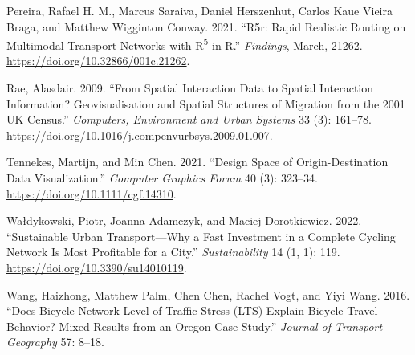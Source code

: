 \documentclass{isprs} %
\newlength{\cslhangindent}
\newlength{\cslentryspacingunit} %
\newenvironment{CSLReferences}[2] %
 {%
  \setlength{\parindent}{0pt}
  \ifodd #1
  \let\oldpar\par
  \def\par{\hangindent=\cslhangindent\oldpar}
  \fi
  \setlength{\parskip}{#2\cslentryspacingunit}
 }%
 {}
\begin{document}
\begin{CSLReferences}{1}{0}
\leavevmode{}%
Pereira, Rafael H. M., Marcus Saraiva, Daniel Herszenhut, Carlos Kaue Vieira Braga, and Matthew Wigginton Conway. 2021. {``R5r: {Rapid Realistic Routing} on {Multimodal Transport Networks} with {R}{\textsuperscript{5}} in {R}.''} \emph{Findings}, March, 21262. \url{https://doi.org/10.32866/001c.21262}.

\leavevmode{}%
Rae, Alasdair. 2009. {``From Spatial Interaction Data to Spatial Interaction Information? {Geovisualisation} and Spatial Structures of Migration from the 2001 {UK} Census.''} \emph{Computers, Environment and Urban Systems} 33 (3): 161--78. \url{https://doi.org/10.1016/j.compenvurbsys.2009.01.007}.

\leavevmode{}%
Tennekes, Martijn, and Min Chen. 2021. {``Design {Space} of {Origin-Destination Data Visualization}.''} \emph{Computer Graphics Forum} 40 (3): 323--34. \url{https://doi.org/10.1111/cgf.14310}.

\leavevmode{}%
Wałdykowski, Piotr, Joanna Adamczyk, and Maciej Dorotkiewicz. 2022. {``Sustainable {Urban Transport}---{Why} a {Fast Investment} in a {Complete Cycling Network Is Most Profitable} for a {City}.''} \emph{Sustainability} 14 (1, 1): 119. \url{https://doi.org/10.3390/su14010119}.

\leavevmode{}%
Wang, Haizhong, Matthew Palm, Chen Chen, Rachel Vogt, and Yiyi Wang. 2016. {``Does Bicycle Network Level of Traffic Stress ({LTS}) Explain Bicycle Travel Behavior? {Mixed} Results from an {Oregon} Case Study.''} \emph{Journal of Transport Geography} 57: 8--18.

\end{CSLReferences}
\end{document}
